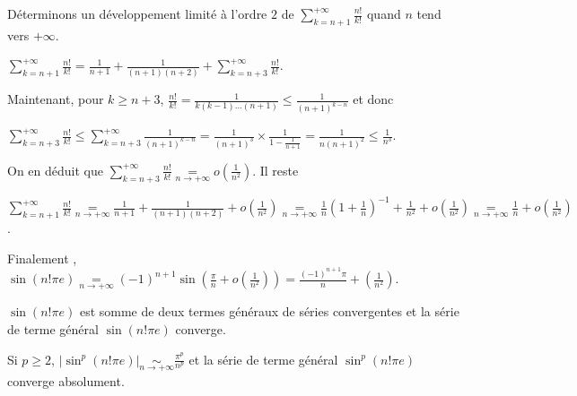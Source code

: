 {{Déterminons un développement limité à l'ordre $2$ de $\sum_{k=n+1}^{+\infty}\frac{n!}{k!}$ quand $n$ tend vers $+\infty$.

\begin{center}
$\sum_{k=n+1}^{+\infty}\frac{n!}{k!}=\frac{1}{n+1}+\frac{1}{(n+1)(n+2)}+\sum_{k=n+3}^{+\infty}\frac{n!}{k!}$.
\end{center}

Maintenant, pour $k\geqslant n+3$, $\frac{n!}{k!}=\frac{1}{k(k-1)\ldots(n+1)}\leqslant\frac{1}{(n+1)^{k-n}}$ et donc

\begin{center} 
$\sum_{k=n+3}^{+\infty}\frac{n!}{k!}\leqslant\sum_{k=n+3}^{+\infty}\frac{1}{(n+1)^{k-n}}=\frac{1}{(n+1)^3}\times\frac{1}{1-\frac{1}{n+1}}=\frac{1}{n(n+1)^2}\leqslant\frac{1}{n^3}$.
\end{center}

On en déduit que $\sum_{k=n+3}^{+\infty}\frac{n!}{k!}\underset{n\rightarrow+\infty}{=}o\left(\frac{1}{n^2}\right)$. Il reste

\begin{center}
$\sum_{k=n+1}^{+\infty}\frac{n!}{k!}\underset{n\rightarrow+\infty}{=}
\frac{1}{n+1}+\frac{1}{(n+1)(n+2)}+o\left(\frac{1}{n^2}\right)\underset{n\rightarrow+\infty}{=}\frac{1}{n}\left(1+\frac{1}{n}\right)^{-1}+\frac{1}{n^2}+o\left(\frac{1}{n^2}\right)
\underset{n\rightarrow+\infty}{=}\frac{1}{n}+o\left(\frac{1}{n^2}\right)
$.
\end{center}

Finalement , $\sin(n!\pi e)\underset{n\rightarrow+\infty}{=}(-1)^{n+1}\sin\left(\frac{\pi}{n}+o\left(\frac{1}{n^2}\right)\right)=\frac{(-1)^{n+1}\pi}{n}+\left(\frac{1}{n^2}\right)$.

$\sin(n!\pi e)$ est somme de deux termes généraux de séries convergentes et la série de terme général $\sin(n!\pi e)$ converge.

Si $p\geqslant2$, $|\sin^p(n!\pi e)|\underset{n\rightarrow+\infty}{\sim}\frac{\pi^p}{n^p}$ et la série de terme général $\sin^p(n!\pi e)$ converge absolument.
}
}
